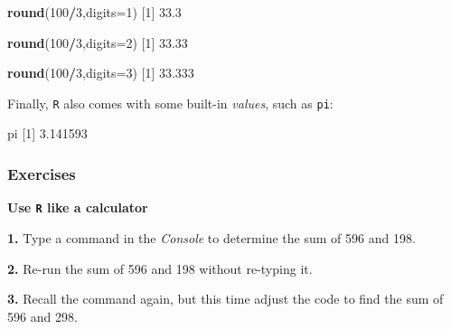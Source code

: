 \documentclass[]{book}
\newenvironment{Shaded}{\begin{snugshade}}{\end{snugshade}}
\newcommand{\DataTypeTok}[1]{\textcolor[rgb]{0.13,0.29,0.53}{#1}}
\newcommand{\DecValTok}[1]{\textcolor[rgb]{0.00,0.00,0.81}{#1}}
\newcommand{\FloatTok}[1]{\textcolor[rgb]{0.00,0.00,0.81}{#1}}
\newcommand{\KeywordTok}[1]{\textcolor[rgb]{0.13,0.29,0.53}{\textbf{#1}}}
\newcommand{\NormalTok}[1]{#1}
\newcommand{\OperatorTok}[1]{\textcolor[rgb]{0.81,0.36,0.00}{\textbf{#1}}}
\begin{document}
\begin{Shaded}
\begin{Highlighting}[]
\KeywordTok{round}\NormalTok{(}\DecValTok{100}\OperatorTok{/}\DecValTok{3}\NormalTok{,}\DataTypeTok{digits=}\DecValTok{1}\NormalTok{)}
\NormalTok{[}\DecValTok{1}\NormalTok{] }\FloatTok{33.3}
\end{Highlighting}
\end{Shaded}

\begin{Shaded}
\begin{Highlighting}[]
\KeywordTok{round}\NormalTok{(}\DecValTok{100}\OperatorTok{/}\DecValTok{3}\NormalTok{,}\DataTypeTok{digits=}\DecValTok{2}\NormalTok{)}
\NormalTok{[}\DecValTok{1}\NormalTok{] }\FloatTok{33.33}
\end{Highlighting}
\end{Shaded}

\begin{Shaded}
\begin{Highlighting}[]
\KeywordTok{round}\NormalTok{(}\DecValTok{100}\OperatorTok{/}\DecValTok{3}\NormalTok{,}\DataTypeTok{digits=}\DecValTok{3}\NormalTok{)}
\NormalTok{[}\DecValTok{1}\NormalTok{] }\FloatTok{33.333}
\end{Highlighting}
\end{Shaded}

Finally, \texttt{R} also comes with some built-in \emph{values}, such as \texttt{pi}:

\begin{Shaded}
\begin{Highlighting}[]
\NormalTok{pi}
\NormalTok{[}\DecValTok{1}\NormalTok{] }\FloatTok{3.141593}
\end{Highlighting}
\end{Shaded}

\hypertarget{exercises}{%
\subsubsection*{Exercises}\label{exercises}}

\textbf{Use \texttt{R} like a calculator}

\textbf{1.} Type a command in the \emph{Console} to determine the sum of 596 and 198.

\textbf{2.} Re-run the sum of 596 and 198 without re-typing it.

\textbf{3.} Recall the command again, but this time adjust the code to find the sum of 596 and 298.
\end{document}
